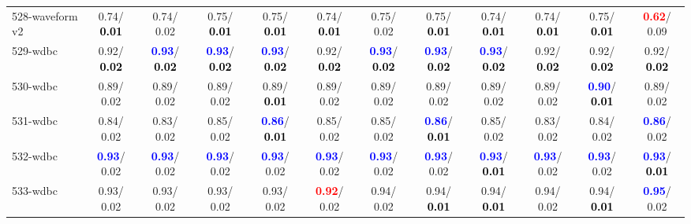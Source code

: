 \begin{table}[h]
\begin{center}
{\begin{tabular}{lc|c|c|c|c|c|c|c|c|c|c}
528-waveform v2 &   0.74/\textcolor{black}{\textbf{  0.01}} &   0.74/  0.02 &   0.75/\textcolor{black}{\textbf{  0.01}} &   0.75/\textcolor{black}{\textbf{  0.01}} &   0.74/\textcolor{black}{\textbf{  0.01}} &   0.75/  0.02 &   0.75/\textcolor{black}{\textbf{  0.01}} &   0.74/\textcolor{black}{\textbf{  0.01}} &   0.74/\textcolor{black}{\textbf{  0.01}} &   0.75/\textcolor{black}{\textbf{  0.01}} & \textcolor{red}{\textbf{  0.62}}/  0.09 \\
529-wdbc &   0.92/\textcolor{black}{\textbf{  0.02}} & \textcolor{blue}{\textbf{  0.93}}/\textcolor{black}{\textbf{  0.02}} & \textcolor{blue}{\textbf{  0.93}}/\textcolor{black}{\textbf{  0.02}} & \textcolor{blue}{\textbf{  0.93}}/\textcolor{black}{\textbf{  0.02}} &   0.92/\textcolor{black}{\textbf{  0.02}} & \textcolor{blue}{\textbf{  0.93}}/\textcolor{black}{\textbf{  0.02}} & \textcolor{blue}{\textbf{  0.93}}/\textcolor{black}{\textbf{  0.02}} & \textcolor{blue}{\textbf{  0.93}}/\textcolor{black}{\textbf{  0.02}} &   0.92/\textcolor{black}{\textbf{  0.02}} &   0.92/\textcolor{black}{\textbf{  0.02}} &   0.92/\textcolor{black}{\textbf{  0.02}} \\
530-wdbc &   0.89/  0.02 &   0.89/  0.02 &   0.89/  0.02 &   0.89/\textcolor{black}{\textbf{  0.01}} &   0.89/  0.02 &   0.89/  0.02 &   0.89/  0.02 &   0.89/  0.02 &   0.89/  0.02 & \textcolor{blue}{\textbf{  0.90}}/\textcolor{black}{\textbf{  0.01}} &   0.89/  0.02 \\
531-wdbc &   0.84/  0.02 &   0.83/  0.02 &   0.85/  0.02 & \textcolor{blue}{\textbf{  0.86}}/\textcolor{black}{\textbf{  0.01}} &   0.85/  0.02 &   0.85/  0.02 & \textcolor{blue}{\textbf{  0.86}}/\textcolor{black}{\textbf{  0.01}} &   0.85/  0.02 &   0.83/  0.02 &   0.84/  0.02 & \textcolor{blue}{\textbf{  0.86}}/  0.02 \\
532-wdbc & \textcolor{blue}{\textbf{  0.93}}/  0.02 & \textcolor{blue}{\textbf{  0.93}}/  0.02 & \textcolor{blue}{\textbf{  0.93}}/  0.02 & \textcolor{blue}{\textbf{  0.93}}/  0.02 & \textcolor{blue}{\textbf{  0.93}}/  0.02 & \textcolor{blue}{\textbf{  0.93}}/  0.02 & \textcolor{blue}{\textbf{  0.93}}/  0.02 & \textcolor{blue}{\textbf{  0.93}}/\textcolor{black}{\textbf{  0.01}} & \textcolor{blue}{\textbf{  0.93}}/  0.02 & \textcolor{blue}{\textbf{  0.93}}/  0.02 & \textcolor{blue}{\textbf{  0.93}}/\textcolor{black}{\textbf{  0.01}} \\
533-wdbc &   0.93/  0.02 &   0.93/  0.02 &   0.93/  0.02 &   0.93/  0.02 & \textcolor{red}{\textbf{  0.92}}/  0.02 &   0.94/  0.02 &   0.94/\textcolor{black}{\textbf{  0.01}} &   0.94/\textcolor{black}{\textbf{  0.01}} &   0.94/  0.02 &   0.94/\textcolor{black}{\textbf{  0.01}} & \textcolor{blue}{\textbf{  0.95}}/  0.02 \\ \hline

\end{tabular}}
\end{center}
\end{table}
